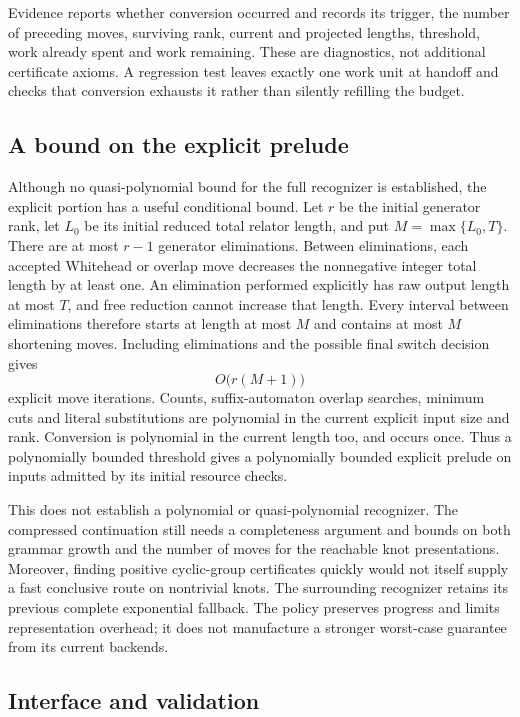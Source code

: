 Evidence reports whether conversion occurred and records its trigger,
the number of preceding moves, surviving rank, current and projected
lengths, threshold, work already spent and work remaining. These are
diagnostics, not additional certificate axioms. A regression test leaves
exactly one work unit at handoff and checks that conversion exhausts it
rather than silently refilling the budget.

\subsection{A bound on the explicit prelude}

Although no quasi-polynomial bound for the full recognizer is established,
the explicit portion has a useful conditional bound. Let $r$ be the initial
generator rank, let $L_0$ be its initial reduced total relator length, and
put $M=\max\{L_0,T\}$. There are at most $r-1$ generator eliminations.
Between eliminations, each accepted Whitehead or overlap move decreases
the nonnegative integer total length by at least one. An elimination
performed explicitly has raw output length at most $T$, and free reduction
cannot increase that length. Every interval between eliminations therefore
starts at length at most $M$ and contains at most $M$ shortening moves.
Including eliminations and the possible final switch decision gives
\[
 O\bigl(r(M+1)\bigr)
\]
explicit move iterations. Counts, suffix-automaton overlap searches,
minimum cuts and literal substitutions are polynomial in the current
explicit input size and rank. Conversion is polynomial in the current
length too, and occurs once. Thus a polynomially bounded threshold gives
a polynomially bounded explicit prelude on inputs admitted by its initial
resource checks.

This does not establish a polynomial or quasi-polynomial recognizer. The
compressed continuation still needs a completeness argument and bounds on
both grammar growth and the number of moves for the reachable knot
presentations. Moreover, finding
positive cyclic-group certificates quickly would not itself supply a fast
conclusive route on nontrivial knots. The surrounding recognizer retains
its previous complete exponential fallback. The policy preserves progress
and limits representation overhead; it does not manufacture a stronger
worst-case guarantee from its current backends.

\subsection{Interface and validation}

